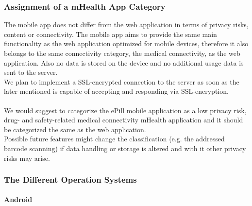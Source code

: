 \subsubsection{Assignment of a mHealth App Category}
The mobile app does not differ from the web application in terms of privacy risks, content or connectivity. The mobile app aims to provide the same main functionality as the web application optimized for mobile devices, therefore it also belongs to the same connectivity category, the medical connectivity, as the web application. Also no data is stored on the device and no additional usage data is sent to the server. 
\\
We plan to implement a SSL-encrypted connection to the server as soon as the later mentioned is capable of accepting and responding via SSL-encryption.
\\
\\
We would suggest to categorize the ePill mobile application as a low privacy risk, drug- and safety-related medical connectivity mHealth application and it should be categorized the same as the web application. 
\\
Possible future features might change the classification (e.g. the addressed barcode scanning) if data handling or storage is altered and with it other privacy risks may arise.

\subsubsection{The Different Operation Systems}
\paragraph{Android}$\;$

